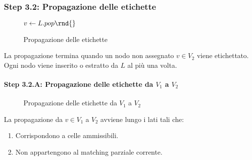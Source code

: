 \documentclass[\main/main.tex]{subfiles}
\begin{document}
\subsubsection{Step 3.2: Propagazione delle etichette}
\begin{figure}
	\begin{algorithm}[H]
		\SetAlgoLined
		\(v \leftarrow L.pop\rnd{}\)\;
		\caption{Propagazione delle etichette}
	\end{algorithm}
\end{figure}

La propagazione termina quando un nodo non assegnato \(v \in V_2\) viene etichettato. Ogni nodo viene inserito o estratto da \(L\) al più una volta.

\paragraph*{Step 3.2.A: Propagazione delle etichette da \(V_1\) a \(V_2\)}
\begin{figure}
	\begin{algorithm}[H]
		\SetAlgoLined
		\caption{Propagazione delle etichette da \(V_1\) a \(V_2\)}
	\end{algorithm}
\end{figure}
La propagazione da \(v \in V_1\) a \(V_2\) avviene lungo i lati tali che:
\begin{enumerate}
	\item Corrispondono a celle ammissibili.
	\item Non appartengono al matching parziale corrente.
\end{enumerate}
\end{document}
